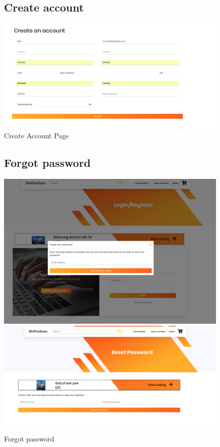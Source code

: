 \documentclass[11pt]{article}
\begin{document}
\begin{figure}[ht!]
    \subsection{Create account}
    \centering
    \includegraphics[width=\textwidth,height=0.3\paperheight,keepaspectratio]{Diagrams/External_Interfaces/Create_Account.png}
    \caption{Create Account Page}
    \label{fig: Create Account Page}
\end{figure}
\FloatBarrier

\begin{figure}[ht!]
    \subsection{Forgot password}
    \centering
    \includegraphics[width=\textwidth,height=0.3\paperheight,keepaspectratio]{Diagrams/External_Interfaces/Forgot_Password_1.png}
    \includegraphics[width=\textwidth,height=0.3\paperheight,keepaspectratio]{Diagrams/External_Interfaces/Forgot_Password_2.png}
    \caption{Forgot password}
    \label{fig: Latest listings}
\end{figure}
\FloatBarrier
\end{document}
